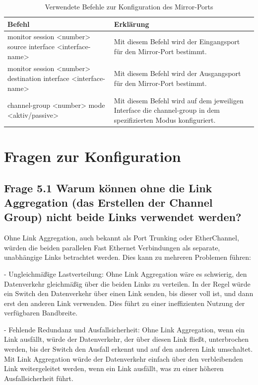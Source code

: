 \documentclass{article}
\begin{document}
\begin{table}[htbp]
    \centering
    \begin{tabularx}{\textwidth}{|X|X|}
        \toprule
        \textbf{Befehl} & \textbf{Erklärung} \\
        \midrule
        monitor session <number> source interface <interface-name> & Mit diesem Befehl wird der Eingangsport für den Mirror-Port bestimmt.\\
        \hline
        monitor session <number> destination interface <interface-name> & Mit diesem Befehl wird der Ausgangsport für den Mirror-Port bestimmt.\\
        \hline
        channel-group <number> mode <aktiv/passive> & Mit diesem Befehl wird auf dem jeweiligen Interface die channel-group in dem spezifizierten Modus konfiguriert.\\
        \bottomrule
    \end{tabularx}
    \caption{Verwendete Befehle zur Konfiguration des Mirror-Ports}
    \label{tab:commands}
\end{table}


\section{Fragen zur Konfiguration}

\subsection*{Frage 5.1 \normalfont Warum können ohne die Link Aggregation (das Erstellen der Channel Group) nicht beide Links verwendet werden?}
Ohne Link Aggregation, auch bekannt als Port Trunking oder EtherChannel, würden die beiden parallelen Fast Ethernet Verbindungen als separate, unabhängige Links betrachtet werden. Dies kann zu mehreren Problemen führen:

- Ungleichmäßige Lastverteilung: Ohne Link Aggregation wäre es schwierig, den Datenverkehr gleichmäßig über die beiden Links zu verteilen. In der Regel würde ein Switch den Datenverkehr über einen Link senden, bis dieser voll ist, und dann erst den anderen Link verwenden. Dies führt zu einer ineffizienten Nutzung der verfügbaren Bandbreite.

- Fehlende Redundanz und Ausfallsicherheit: Ohne Link Aggregation, wenn ein Link ausfällt, würde der Datenverkehr, der über diesen Link fließt, unterbrochen werden, bis der Switch den Ausfall erkennt und auf den anderen Link umschaltet. Mit Link Aggregation würde der Datenverkehr einfach über den verbleibenden Link weitergeleitet werden, wenn ein Link ausfällt, was zu einer höheren Ausfallsicherheit führt.\\
\end{document}
